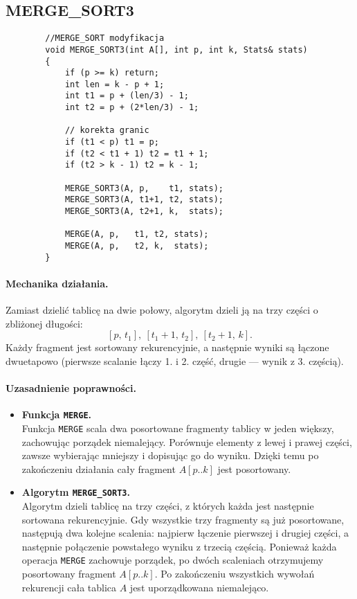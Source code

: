 \documentclass{article}
\begin{document}
	
	\subsection*{MERGE\_SORT3}
	
	\begin{lstlisting}
		//MERGE_SORT modyfikacja
		void MERGE_SORT3(int A[], int p, int k, Stats& stats)
		{
			if (p >= k) return;
			int len = k - p + 1;
			int t1 = p + (len/3) - 1;
			int t2 = p + (2*len/3) - 1;
			
			// korekta granic
			if (t1 < p) t1 = p;
			if (t2 < t1 + 1) t2 = t1 + 1;
			if (t2 > k - 1) t2 = k - 1;
			
			MERGE_SORT3(A, p,    t1, stats);
			MERGE_SORT3(A, t1+1, t2, stats);
			MERGE_SORT3(A, t2+1, k,  stats);
			
			MERGE(A, p,   t1, t2, stats);
			MERGE(A, p,   t2, k,  stats);
		}
	\end{lstlisting}
	
	\paragraph{Mechanika działania.}
	Zamiast dzielić tablicę na dwie połowy, algorytm dzieli ją na trzy części o zbliżonej długości:
	\[
	[p,\,t_1],\ [t_1{+}1,\,t_2],\ [t_2{+}1,\,k].
	\]
	Każdy fragment jest sortowany rekurencyjnie, a następnie wyniki są łączone dwuetapowo (pierwsze scalanie łączy 1. i 2. część, drugie — wynik z 3. częścią).
	
	\paragraph{Uzasadnienie poprawności.}
	
	\begin{itemize}
		\item \textbf{Funkcja \texttt{MERGE}.} \\
		Funkcja \texttt{MERGE} scala dwa posortowane fragmenty tablicy w jeden większy, zachowując porządek niemalejący. 
		Porównuje elementy z lewej i prawej części, zawsze wybierając mniejszy i dopisując go do wyniku. 
		Dzięki temu po zakończeniu działania cały fragment $A[p..k]$ jest posortowany.
		
		\item \textbf{Algorytm \texttt{MERGE\_SORT3}.} \\
		Algorytm dzieli tablicę na trzy części, z których każda jest następnie sortowana rekurencyjnie.  
		Gdy wszystkie trzy fragmenty są już posortowane, następują dwa kolejne scalenia: 
		najpierw łączenie pierwszej i drugiej części, a następnie połączenie powstałego wyniku z trzecią częścią.  
		Ponieważ każda operacja \texttt{MERGE} zachowuje porządek, po dwóch scaleniach otrzymujemy posortowany fragment $A[p..k]$.  
		Po zakończeniu wszystkich wywołań rekurencji cała tablica $A$ jest uporządkowana niemalejąco.
	\end{itemize}
	
\end{document}
